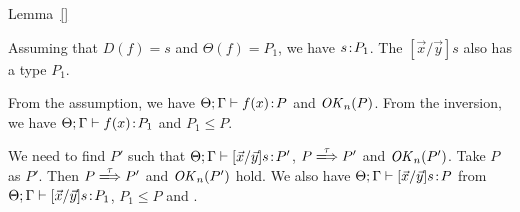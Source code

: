 \begin{pfof}{Lemma~\ref{}}
\begin{itemize}
  Assuming that \(D(f) = s\) and \(\Theta(f) = P_1\), we have \(s\!:\!
  P_1\). The \([\vec{x}/\vec{y}]s\) also has a type \(P_1\).

  From the assumption, we have \(\Theta;\Gamma \vdash f(x)\!:\! P\) and
  \(\mathit{OK}_n(P)\). From the inversion, we have \(\Theta;\Gamma \vdash
  f(x)\!:\! P_1\) and \(P_1 \le P\).

  We need to find \(P'\) such that \(\Theta;\Gamma \vdash [\vec{x}/\vec{y}]s\!:\!
  P'\), \(P \xLongrightarrow{\tau} P'\) and \(\mathit{OK}_n(P')\). Take \(P\) as
  \(P'\). Then \(P \xLongrightarrow{\tau} P'\) and \(\mathit{OK}_n(P')\) hold. We
  also have \(\Theta;\Gamma \vdash [\vec{x}/\vec{y}]s\!:\! P \) from
  \(\Theta;\Gamma \vdash [\vec{x}/\vec{y}]s\!:\! P_1\), \(P_1 \le P\) and
  .

\end{itemize}

\end{pfof}
